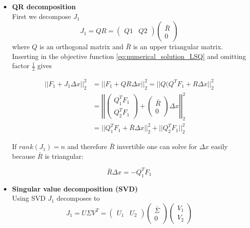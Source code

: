 \documentclass{scrartcl}[12pt, halfparskip]
\numberwithin{equation}{section}
\numberwithin{figure}{section}
\numberwithin{table}{section}
\begin{document}
\begin{itemize}
	\item \textbf{QR decomposition} \\
	First we decompose $J_1$
	\begin{equation}
		J_1 = Q R = 
		\begin{pmatrix}
			Q1 & Q2
		\end{pmatrix}
		\begin{pmatrix}
			\bar{R} \\
			0
		\end{pmatrix}
	\end{equation}
	where $Q$ is an orthogonal matrix and $\bar{R}$ is an upper triangular matrix. Inserting in the objective function \eqref{eq:numerical_solution_LSQ} and omitting factor $\frac{1}{2}$ gives
	
	\begin{align}
		|| F_1 + J_1 \Delta x ||_2^2 & = || F_1 + Q R \Delta x ||_2^2 = || Q( Q^T F_1 + R \Delta x ||_2^2 \\
		& = \left| \left| \begin{pmatrix}
		Q_1^T F_1 \\
		Q_2^T F_1
		\end{pmatrix} + 
		\begin{pmatrix}
		\bar{R} \\
		0
		\end{pmatrix}
		\Delta x \right| \right|_2^2 \nonumber \\
		& = || Q_1^T F_1 + \bar{R} \Delta x ||_2^2 + ||Q_2^T F_1 ||_2^2 \nonumber
	\end{align}
	
	If $rank(J_1)=n$ and therefore $\bar{R}$ invertible one can solve for $\Delta x$ easily because $\bar{R}$ is triangular:
	
	\begin{equation}
		\bar{R} \Delta x = -Q_1^T F_1
	\end{equation}
	
	\item \textbf{Singular value decomposition (SVD)} \\
	Using SVD $J_1$ decomposes to
	\begin{equation}
		J_1 = U \Sigma V^T =
		\begin{pmatrix}
			U_1 & U_2
		\end{pmatrix}
		\begin{pmatrix}
			\bar{\Sigma} \\
			0
		\end{pmatrix}
		\begin{pmatrix}
			V_1 \\
			V_2
		\end{pmatrix}
	\end{equation}
	

\end{itemize}
\end{document}
